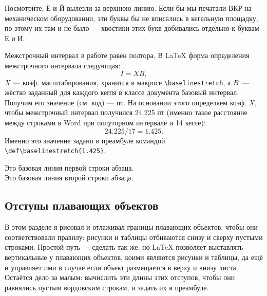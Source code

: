 Посмотрите, Ё и Й вылезли за верхнюю линию. Если бы мы печатали ВКР на механическом оборудовании, эти буквы бы не вписались в кегельную площадку, по этому их там и не было --- хвостики этих букв добивались отдельно к буквам Е и И.

Межстрочный интервал в работе равен полтора. В \LaTeX{} форма определения межстрочного интервала следующая:
\begin{equation}
	I = X B,
\end{equation}
$X$ --- коэф. масштабирования, хранится в макросе \Verb|\baselinestretch|, а $B$~--- жёстко заданный для каждого кегля в классе документа базовый интервал.  Получим его значение (см. код) --- %
{%
	\def\baselinestretch{1}%
	\selectfont%
	\xdef\tmpbaselineskip{\fpeval{\baselineskip}}%
}%
\tmpbaselineskip{} пт. %
На основании этого определяем коэф. $X$, чтобы межстрочный интервал получился 24.225 пт (именно такое расстояние между строками в Word при полуторном интервале и 14 кегле):
\begin{equation}
	24.225 / 17 = 1.425.
\end{equation}
Именно это значение задано в преамбуле командой \Verb|\def\baselinestretch{1.425}|.

%
%
Это базовая линия первой строки абзаца.   \\%
% 
Это базовая линия второй строки абзаца.%
%



\subsection{Отступы плавающих объектов}

В этом разделе я рисовал и отлаживал границы плавающих объектов, чтобы они соответствовали правилу: рисунки и таблицы отбиваются снизу и сверху пустыми строками. Простой путь --- сделать так же, но \LaTeX{} позволяет выставлять вертикальные у плавающих объектов, коими являются рисунки и таблицы, да ещё и управляет ими в случае если объект размещается в верху и внизу листа. Остаётся дело за малым: вычислить эти длины этих отступов, чтобы они равнялись пустым вордовским строкам, и задать их в преамбуле.


